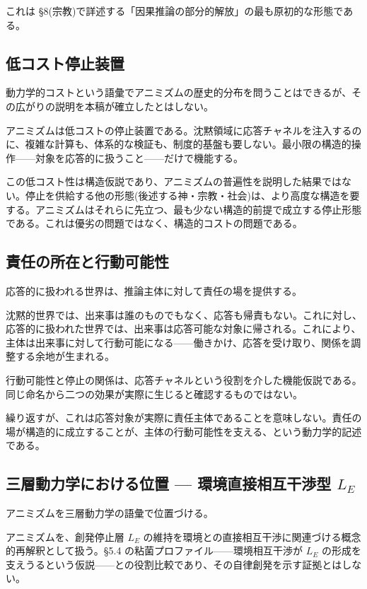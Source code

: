 これは \S{}8(宗教)で詳述する「因果推論の部分的解放」の最も原初的な形態である。

\bigskip


\subsection{低コスト停止装置}


動力学的コストという語彙でアニミズムの歴史的分布を問うことはできるが、その広がりの説明を本稿が確立したとはしない。

アニミズムは低コストの停止装置である。沈黙領域に応答チャネルを注入するのに、複雑な計算も、体系的な検証も、制度的基盤も要しない。最小限の構造的操作——対象を応答的に扱うこと——だけで機能する。

この低コスト性は構造仮説であり、アニミズムの普遍性を説明した結果ではない。停止を供給する他の形態(後述する神・宗教・社会)は、より高度な構造を要する。アニミズムはそれらに先立つ、最も少ない構造的前提で成立する停止形態である。これは優劣の問題ではなく、構造的コストの問題である。

\bigskip


\subsection{責任の所在と行動可能性}


応答的に扱われる世界は、推論主体に対して責任の場を提供する。

沈黙的世界では、出来事は誰のものでもなく、応答も帰責もない。これに対し、応答的に扱われた世界では、出来事は応答可能な対象に帰される。これにより、主体は出来事に対して行動可能になる——働きかけ、応答を受け取り、関係を調整する余地が生まれる。

行動可能性と停止の関係は、応答チャネルという役割を介した機能仮説である。同じ命名から二つの効果が実際に生じると確認するものではない。

繰り返すが、これは応答対象が実際に責任主体であることを意味しない。責任の場が構造的に成立することが、主体の行動可能性を支える、という動力学的記述である。

\bigskip


\subsection{三層動力学における位置 — 環境直接相互干渉型 $L_E$}


アニミズムを三層動力学の語彙で位置づける。

アニミズムを、創発停止層 $L_E$ の維持を環境との直接相互干渉に関連づける概念的再解釈として扱う。\S{}5.4 の粘菌プロファイル——環境相互干渉が $L_E$ の形成を支えうるという仮説——との役割比較であり、その自律創発を示す証拠とはしない。

